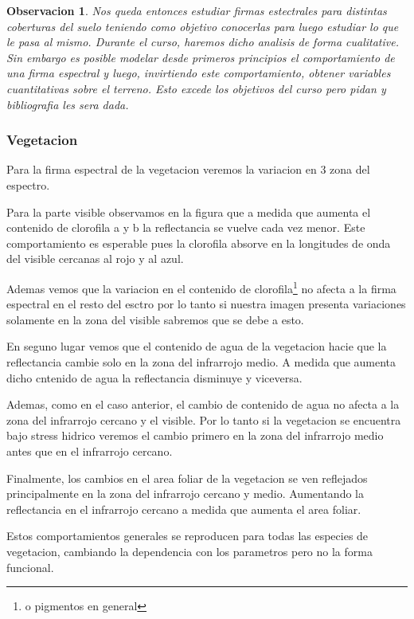 \documentclass[a4paper,12pt]{article}
\newtheorem*{obs}{Observacion}
\begin{document}
\begin{obs}
Nos queda entonces estudiar firmas estectrales para distintas coberturas del
suelo teniendo como objetivo conocerlas para luego estudiar lo que le pasa al
mismo. Durante el curso, haremos dicho analisis de forma cualitative. Sin
embargo es posible modelar desde primeros principios el comportamiento de una
firma espectral y luego, invirtiendo este comportamiento, obtener variables
cuantitativas sobre el terreno. Esto excede los objetivos del curso pero pidan y
bibliografia les sera dada.
\end{obs}

\subsubsection{Vegetacion}
Para la firma espectral de la vegetacion veremos la variacion en 3 zona del
espectro.

Para la parte visible observamos en la figura que a medida que aumenta el
contenido de clorofila a y b la reflectancia se vuelve cada vez menor. Este
comportamiento es esperable pues la clorofila absorve en la longitudes de onda
del visible cercanas al rojo y al azul.

Ademas vemos que la variacion en el contenido de clorofila\footnote{o pigmentos
en general} no afecta a la firma espectral en el resto del esctro por lo tanto
si nuestra imagen presenta variaciones solamente en la zona del visible sabremos
que se debe a esto.

En seguno lugar vemos que el contenido de agua de la vegetacion hacie que la
reflectancia cambie solo en la zona del infrarrojo medio. A medida que aumenta
dicho cntenido de agua la reflectancia disminuye y viceversa.

Ademas, como en el caso anterior, el cambio de contenido de agua no afecta a la
zona del infrarrojo cercano y el visible. Por lo tanto si la vegetacion se
encuentra bajo stress hidrico veremos el cambio primero en la zona del
infrarrojo medio antes que en el infrarrojo cercano.

Finalmente, los cambios en el area foliar de la vegetacion se ven reflejados
principalmente en la zona del infrarrojo cercano y medio. Aumentando la
reflectancia en el infrarrojo cercano a medida que aumenta el area foliar.

Estos comportamientos generales se reproducen para todas las especies de
vegetacion, cambiando la dependencia con los parametros pero no la forma
funcional.
\end{document}
